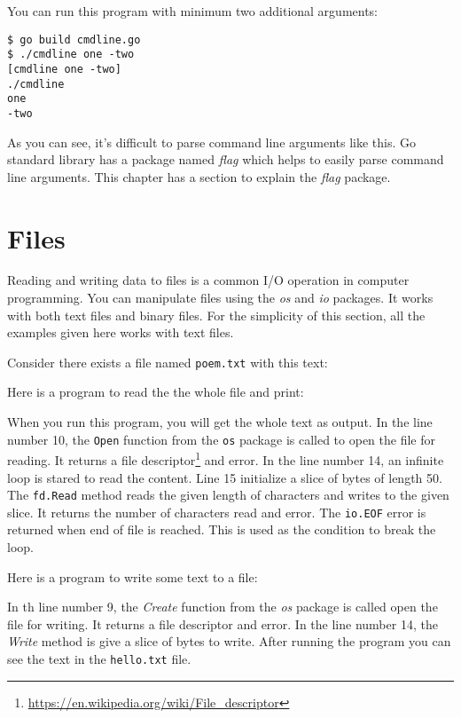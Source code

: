You can run this program with minimum two additional arguments:

\begin{lstlisting}[numbers=none]
$ go build cmdline.go
$ ./cmdline one -two
[cmdline one -two]
./cmdline
one
-two
\end{lstlisting}

As you can see, it's difficult to parse command line arguments like this. Go
standard library has a package named \textit{flag} which helps to easily parse
command line arguments. This chapter has a section to explain the \textit{flag}
package.

\section{Files}

Reading and writing data to files is a common I/O operation in computer
programming. You can manipulate files using the \textit{os} and \textit{io}
packages. It works with both text files and binary files. For the simplicity of
this section, all the examples given here works with text files.

Consider there exists a file named \texttt{poem.txt} with this text:



Here is a program to read the the whole file and print:



When you run this program, you will get the whole text as output. In the line
number 10, the \texttt{Open} function from the \texttt{os} package is called to open
the file for reading. It returns a file
descriptor\footnote{\url{https://en.wikipedia.org/wiki/File_descriptor}} and
error. In the line number 14, an infinite loop is stared to read the content.
Line 15 initialize a slice of bytes of length 50. The \texttt{fd.Read} method
reads the given length of characters and writes to the given slice. It returns
the number of characters read and error. The \texttt{io.EOF} error is returned
when end of file is reached. This is used as the condition to break the loop.

Here is a program to write some text to a file:



In th line number 9, the \textit{Create} function from the \textit{os} package
is called open the file for writing. It returns a file descriptor and error. In
the line number 14, the \textit{Write} method is give a slice of bytes to write.
After running the program you can see the text in the \texttt{hello.txt} file.

